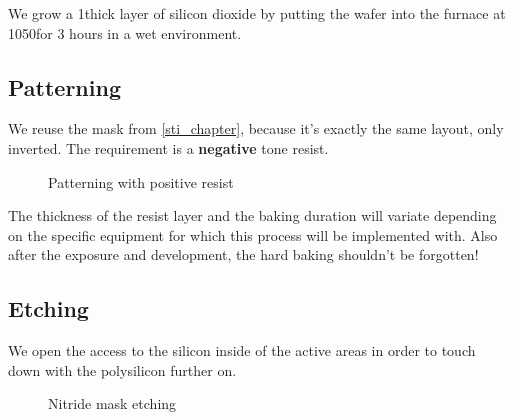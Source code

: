 We grow a 1\um thick layer of silicon dioxide by putting the wafer into the furnace at 1050\degreesC for 3 hours in a wet environment.

\subsection{Patterning}

We reuse the mask from \autoref{sti_chapter}, because it's exactly the same layout, only inverted.
The requirement is a \textbf{negative} tone resist.

\begin{figure}[H]
	\centering
	\begin{tikzpicture}[node distance = 3cm, auto, thick,scale=\CrossSectionOnly, every node/.style={transform shape}]
		
	\end{tikzpicture}
	\begin{tikzpicture}[node distance = 3cm, auto, thick,scale=\CrossSectionOnly, every node/.style={transform shape}]
		
	\end{tikzpicture}
	\caption{Patterning with positive resist}
\end{figure}

The thickness of the resist layer and the baking duration will variate depending on the specific equipment for which this process will be implemented with.
Also after the exposure and development, the hard baking shouldn't be forgotten!

\newpage

\subsection{Etching}\label{fox_etch}

We open the access to the silicon inside of the active areas in order to touch down with the polysilicon further on.

\begin{figure}[H]
	\centering
	\begin{tikzpicture}[node distance = 3cm, auto, thick,scale=\CrossSectionOnly, every node/.style={transform shape}]
		
	\end{tikzpicture}
	\drawStepArrow{}
	\begin{tikzpicture}[node distance = 3cm, auto, thick,scale=\CrossSectionOnly, every node/.style={transform shape}]
		
	\end{tikzpicture}
	\caption{Nitride mask etching}
\end{figure}

